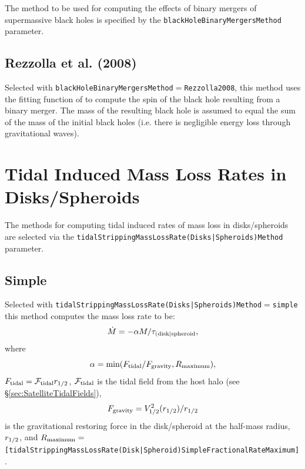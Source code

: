 The method to be used for computing the effects of binary mergers of supermassive black holes is specified by the {\tt blackHoleBinaryMergersMethod} parameter.

\subsection{Rezzolla et al. (2008)}

Selected with {\tt blackHoleBinaryMergersMethod}$=${\tt Rezzolla2008}, this method uses the fitting function of \cite{rezzolla_final_2008} to compute the spin of the black hole resulting from a binary merger. The mass of the resulting black hole is assumed to equal the sum of the mass of the initial black holes (i.e. there is negligible energy loss through gravitational waves).

\section{Tidal Induced Mass Loss Rates in Disks/Spheroids}\label{sec:TidalMassLossRates}

The methods for computing tidal induced rates of mass loss in disks/spheroids are selected via the {\tt tidalStrippingMassLossRate(Disks|Spheroids)Method} parameter.

\subsection{Simple}

Selected with {\tt tidalStrippingMassLossRate(Disks|Spheroids)Method}$=${\tt simple} this method computes the mass loss rate to be:
\begin{equation}
\dot{M} = -\alpha M/\tau_{\rm (disk|spheroid},
\end{equation}
where
\begin{equation}
\alpha = \hbox{min}(F_{\rm tidal}/F_{\rm gravity},R_{\rm maximum}),
\end{equation}
$F_{\rm tidal}=\mathcal{F}_{\rm tidal} r_{1/2}$, $\mathcal{F}_{\rm tidal}$ is the tidal field from the host halo (see \S\ref{sec:SatelliteTidalFields}),
\begin{equation}
F_{\rm gravity} = V_{1/2}^2(r_{1/2})/r_{1/2}
\end{equation}
is the gravitational restoring force in the disk/spheroid at the half-mass radius, $r_{\rm 1/2}$, and $R_{\rm maximum}=${\tt [tidalStrippingMassLossRate(Disk|Spheroid)SimpleFractionalRateMaximum]}.

